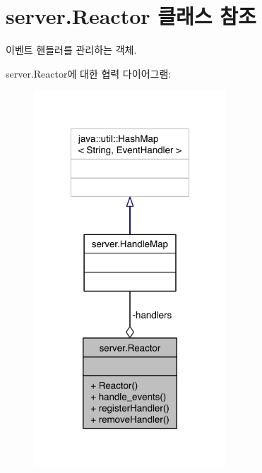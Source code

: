 \hypertarget{classserver_1_1_reactor}{\section{server.\-Reactor 클래스 참조}
\label{classserver_1_1_reactor}
}


이벤트 핸들러를 관리하는 객체.  




server.\-Reactor에 대한 협력 다이어그램\-:\nopagebreak
\begin{figure}[H]
\begin{center}
\leavevmode
\includegraphics[width=204pt]{classserver_1_1_reactor__coll__graph}
\end{center}
\end{figure}
